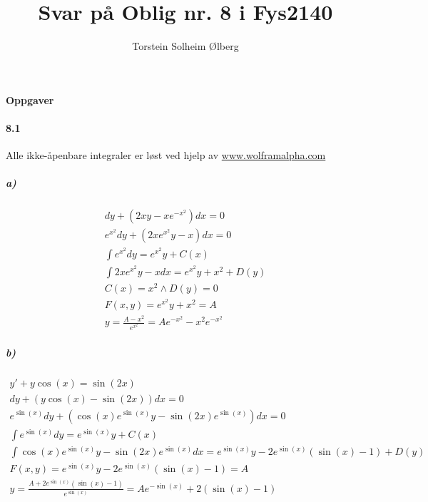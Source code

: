 \documentclass[11pt, A4paper,norsk]{article}
\author{Torstein Solheim Ølberg}
\title{Svar på Oblig nr. 8 i Fys2140}
\begin{document}
\maketitle
	\begin{center}
\Large \textbf{Oppgaver}
	\end{center}









		\paragraph{8.1}
			\begin{flushleft}
Alle ikke-åpenbare integraler er løst ved hjelp av \url{www.wolframalpha.com}
			\end{flushleft}
			\subparagraph{a)}
				\begin{gather*}
dy + (2xy - x e^{- x^2}) dx = 0 \\
e^{x^2} dy + ( 2x e^{x^2}y - x ) dx = 0 \\
\int e^{x^2} dy = e^{x^2}y + C(x) \\
\int 2x e^{x^2} y - x dx = e^{x^2} y + x^2 + D(y) \\
C(x) = x^2 \wedge D(y) = 0 \\
F(x, y) = e^{x^2} y + x^2 = A \\
y = \frac{A - x^2}{e^{x^2}} = A e^{- x^2} - x^2 e^{- x^2}
				\end{gather*}









			\subparagraph{b)}
				\begin{gather*}
y' + y \cos(x) = \sin(2 x) \\
dy + (y \cos(x) - \sin(2 x))dx = 0 \\
e^{\sin(x)} dy + ( \cos(x) e^{\sin(x)} y - \sin(2 x) e^{\sin(x)})dx = 0 \\
\int e^{\sin(x)} dy = e^{\sin(x)} y + C(x) \\
\int \cos(x) e^{\sin(x)} y - \sin(2 x) e^{\sin(x)} dx = e^{\sin(x)} y - 2 e^{\sin(x)} (\sin(x) - 1) + D(y) \\
F(x, y) = e^{\sin(x)} y - 2 e^{\sin(x)} (\sin(x) - 1) = A \\
y = \frac{A + 2 e^{\sin(x)} (\sin(x) - 1)}{e^{\sin(x)}} = A e^{- \sin(x)} + 2 (\sin(x) - 1)
				\end{gather*}
\end{document}
